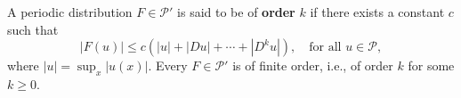 A periodic distribution $F \in \mathcal{P}'$ is said to be of \textbf{order} $k$ if there exists a constant $c$ such that
$$|F(u)| \leq c\left(|u| + |Du| + \cdots + |D^k u|\right), \quad \text{for all } u \in \mathcal{P},$$
where $|u| = \sup_x |u(x)|$. Every $F \in \mathcal{P}'$ is of finite order, i.e., of order $k$ for some $k \geq 0$.
